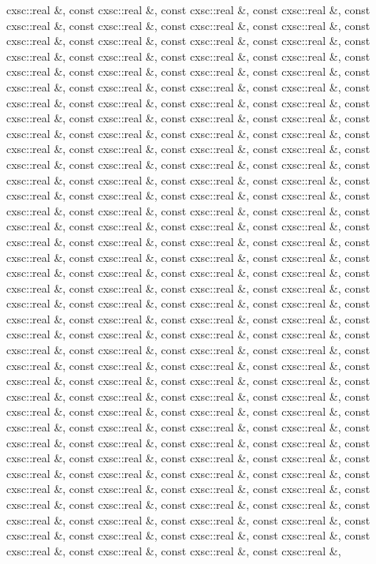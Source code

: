 \begin{DoxyCompactItemize}
cxsc\-::real \&, const cxsc\-::real \&, const cxsc\-::real \&, const cxsc\-::real \&, const cxsc\-::real \&, const cxsc\-::real \&, const cxsc\-::real \&, const cxsc\-::real \&, const cxsc\-::real \&, const cxsc\-::real \&, const cxsc\-::real \&, const cxsc\-::real \&, const cxsc\-::real \&, const cxsc\-::real \&, const cxsc\-::real \&, const cxsc\-::real \&, const cxsc\-::real \&, const cxsc\-::real \&, const cxsc\-::real \&, const cxsc\-::real \&, const cxsc\-::real \&, const cxsc\-::real \&, const cxsc\-::real \&, const cxsc\-::real \&, const cxsc\-::real \&, const cxsc\-::real \&, const cxsc\-::real \&, const cxsc\-::real \&, const cxsc\-::real \&, const cxsc\-::real \&, const cxsc\-::real \&, const cxsc\-::real \&, const cxsc\-::real \&, const cxsc\-::real \&, const cxsc\-::real \&, const cxsc\-::real \&, const cxsc\-::real \&, const cxsc\-::real \&, const cxsc\-::real \&, const cxsc\-::real \&, const cxsc\-::real \&, const cxsc\-::real \&, const cxsc\-::real \&, const cxsc\-::real \&, const cxsc\-::real \&, const cxsc\-::real \&, const cxsc\-::real \&, const cxsc\-::real \&, const cxsc\-::real \&, const cxsc\-::real \&, const cxsc\-::real \&, const cxsc\-::real \&, const cxsc\-::real \&, const cxsc\-::real \&, const cxsc\-::real \&, const cxsc\-::real \&, const cxsc\-::real \&, const cxsc\-::real \&, const cxsc\-::real \&, const cxsc\-::real \&, const cxsc\-::real \&, const cxsc\-::real \&, const cxsc\-::real \&, const cxsc\-::real \&, const cxsc\-::real \&, const cxsc\-::real \&, const cxsc\-::real \&, const cxsc\-::real \&, const cxsc\-::real \&, const cxsc\-::real \&, const cxsc\-::real \&, const cxsc\-::real \&, const cxsc\-::real \&, const cxsc\-::real \&, const cxsc\-::real \&, const cxsc\-::real \&, const cxsc\-::real \&, const cxsc\-::real \&, const cxsc\-::real \&, const cxsc\-::real \&, const cxsc\-::real \&, const cxsc\-::real \&, const cxsc\-::real \&, const cxsc\-::real \&, const cxsc\-::real \&, const cxsc\-::real \&, const cxsc\-::real \&, const cxsc\-::real \&, const cxsc\-::real \&, const cxsc\-::real \&, const cxsc\-::real \&, const cxsc\-::real \&, const cxsc\-::real \&, const cxsc\-::real \&, const cxsc\-::real \&, const cxsc\-::real \&, const cxsc\-::real \&, const cxsc\-::real \&, const cxsc\-::real \&, const cxsc\-::real \&, const cxsc\-::real \&, const cxsc\-::real \&, const cxsc\-::real \&, const cxsc\-::real \&, const cxsc\-::real \&, const cxsc\-::real \&, const cxsc\-::real \&, const cxsc\-::real \&, const cxsc\-::real \&, const cxsc\-::real \&, const cxsc\-::real \&, const cxsc\-::real \&, const cxsc\-::real \&, const cxsc\-::real \&, const cxsc\-::real \&, const cxsc\-::real \&, const cxsc\-::real \&, const cxsc\-::real \&, const cxsc\-::real \&, const cxsc\-::real \&, const cxsc\-::real \&, const cxsc\-::real \&, const cxsc\-::real \&, const cxsc\-::real \&, const cxsc\-::real \&, const cxsc\-::real \&, const cxsc\-::real \&, const cxsc\-::real \&, const cxsc\-::real \&, const cxsc\-::real \&, const cxsc\-::real \&, const cxsc\-::real \&, const cxsc\-::real \&, const cxsc\-::real \&, const cxsc\-::real \&, const cxsc\-::real \&, const cxsc\-::real \&, const cxsc\-::real \&, const cxsc\-::real \&, const cxsc\-::real \&, const cxsc\-::real \&, const cxsc\-::real \&, const cxsc\-::real \&, const cxsc\-::real \&, 
\end{DoxyCompactItemize}
